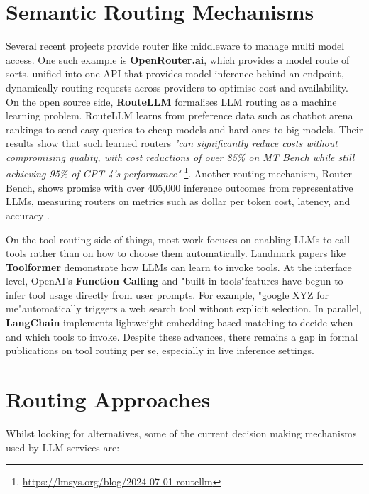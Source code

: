 \section{Semantic Routing Mechanisms}

Several recent projects provide router like middleware to manage multi model access. One such example is \textbf{OpenRouter.ai}, which provides a model route of sorts, unified into one API that provides model inference behind an endpoint, dynamically routing requests across providers to optimise cost and availability. On the open source side, \textbf{RouteLLM} formalises LLM routing as a machine learning problem. RouteLLM learns from preference data such as chatbot arena rankings to send easy queries to cheap models and hard ones to big models. Their results show that such learned routers \textit{"can significantly reduce costs without compromising quality, with cost reductions of over 85\% on MT Bench while still achieving 95\% of GPT 4's performance"} \footnote{\url{https://lmsys.org/blog/2024-07-01-routellm}}. Another routing mechanism, Router Bench, shows promise with over 405,000 inference outcomes from representative LLMs, measuring routers on metrics such as dollar per token cost, latency, and accuracy \cite{hu2024routerbenchbenchmarkmultillmrouting}.

On the tool routing side of things, most work focuses on enabling LLMs to call tools rather than on how to choose them automatically. Landmark papers like \textbf{Toolformer} \cite{schick2023toolformerlanguagemodelsteach} demonstrate how LLMs can learn to invoke tools. At the interface level, OpenAI's \textbf{Function Calling} and "built in tools"features have begun to infer tool usage directly from user prompts. For example, "google XYZ for me"automatically triggers a web search tool without explicit selection. In parallel, \textbf{LangChain} implements lightweight embedding based matching to decide when and which tools to invoke. Despite these advances, there remains a gap in formal publications on tool routing per se, especially in live inference settings.

\section{Routing Approaches}

Whilst looking for alternatives, some of the current decision making mechanisms used by LLM services are:

